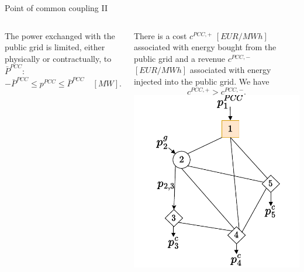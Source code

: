 \begin{frame}{Point of common coupling II}
\begin{columns}
    The power exchanged with the public grid is limited, either physically or contractually, to $\bar{P}^{PCC}$: $$ -\bar{P}^{PCC} \leq p^{PCC} \leq \bar{P}^{PCC} \quad [MW].$$
    
    There is a cost $c^{PCC,+}$ $[EUR/MWh]$ associated with energy bought from the public grid and a revenue $c^{PCC,-}$ $[EUR/MWh]$ associated with energy injected into the public grid. We have $$c^{PCC,+} > c^{PCC,-}.$$
\includegraphics[width=\textwidth]{images/netwok_flow-Page-2_drawio.pdf}
\end{columns}
\end{frame}


